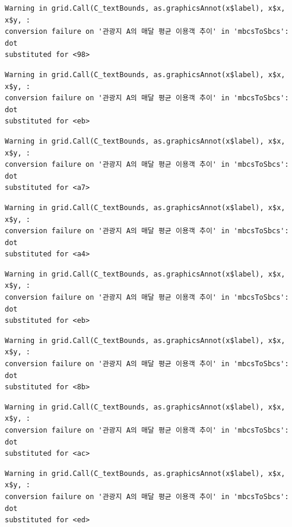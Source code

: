 \documentclass[
  letterpaper,
  DIV=11,
  numbers=noendperiod]{scrreprt}
\begin{document}
\begin{verbatim}
Warning in grid.Call(C_textBounds, as.graphicsAnnot(x$label), x$x, x$y, :
conversion failure on '관광지 A의 매달 평균 이용객 추이' in 'mbcsToSbcs': dot
substituted for <98>
\end{verbatim}

\begin{verbatim}
Warning in grid.Call(C_textBounds, as.graphicsAnnot(x$label), x$x, x$y, :
conversion failure on '관광지 A의 매달 평균 이용객 추이' in 'mbcsToSbcs': dot
substituted for <eb>
\end{verbatim}

\begin{verbatim}
Warning in grid.Call(C_textBounds, as.graphicsAnnot(x$label), x$x, x$y, :
conversion failure on '관광지 A의 매달 평균 이용객 추이' in 'mbcsToSbcs': dot
substituted for <a7>
\end{verbatim}

\begin{verbatim}
Warning in grid.Call(C_textBounds, as.graphicsAnnot(x$label), x$x, x$y, :
conversion failure on '관광지 A의 매달 평균 이용객 추이' in 'mbcsToSbcs': dot
substituted for <a4>
\end{verbatim}

\begin{verbatim}
Warning in grid.Call(C_textBounds, as.graphicsAnnot(x$label), x$x, x$y, :
conversion failure on '관광지 A의 매달 평균 이용객 추이' in 'mbcsToSbcs': dot
substituted for <eb>
\end{verbatim}

\begin{verbatim}
Warning in grid.Call(C_textBounds, as.graphicsAnnot(x$label), x$x, x$y, :
conversion failure on '관광지 A의 매달 평균 이용객 추이' in 'mbcsToSbcs': dot
substituted for <8b>
\end{verbatim}

\begin{verbatim}
Warning in grid.Call(C_textBounds, as.graphicsAnnot(x$label), x$x, x$y, :
conversion failure on '관광지 A의 매달 평균 이용객 추이' in 'mbcsToSbcs': dot
substituted for <ac>
\end{verbatim}

\begin{verbatim}
Warning in grid.Call(C_textBounds, as.graphicsAnnot(x$label), x$x, x$y, :
conversion failure on '관광지 A의 매달 평균 이용객 추이' in 'mbcsToSbcs': dot
substituted for <ed>
\end{verbatim}
\end{document}
